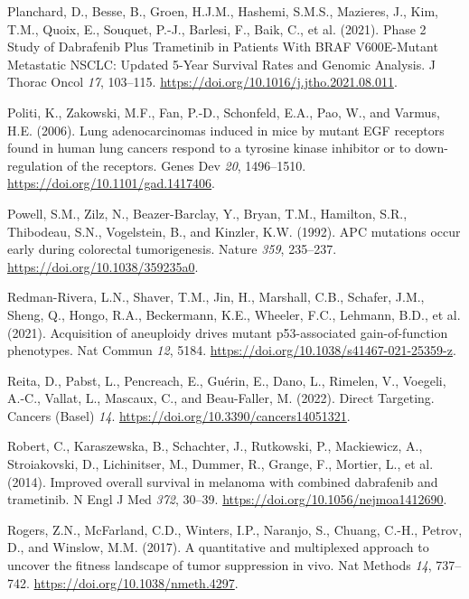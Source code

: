 \begin{CSLReferences}{0}{0}
\leavevmode{}%
Planchard, D., Besse, B., Groen, H.J.M., Hashemi, S.M.S., Mazieres, J., Kim, T.M., Quoix, E., Souquet, P.-J., Barlesi, F., Baik, C., et al. (2021). Phase 2 Study of Dabrafenib Plus Trametinib in Patients With BRAF V600E-Mutant Metastatic NSCLC: Updated 5-Year Survival Rates and Genomic Analysis. J Thorac Oncol \emph{17}, 103--115. \url{https://doi.org/10.1016/j.jtho.2021.08.011}.

\leavevmode{}%
Politi, K., Zakowski, M.F., Fan, P.-D., Schonfeld, E.A., Pao, W., and Varmus, H.E. (2006). Lung adenocarcinomas induced in mice by mutant EGF receptors found in human lung cancers respond to a tyrosine kinase inhibitor or to down-regulation of the receptors. Genes Dev \emph{20}, 1496--1510. \url{https://doi.org/10.1101/gad.1417406}.

\leavevmode{}%
Powell, S.M., Zilz, N., Beazer-Barclay, Y., Bryan, T.M., Hamilton, S.R., Thibodeau, S.N., Vogelstein, B., and Kinzler, K.W. (1992). APC mutations occur early during colorectal tumorigenesis. Nature \emph{359}, 235--237. \url{https://doi.org/10.1038/359235a0}.

\leavevmode{}%
Redman-Rivera, L.N., Shaver, T.M., Jin, H., Marshall, C.B., Schafer, J.M., Sheng, Q., Hongo, R.A., Beckermann, K.E., Wheeler, F.C., Lehmann, B.D., et al. (2021). Acquisition of aneuploidy drives mutant p53-associated gain-of-function phenotypes. Nat Commun \emph{12}, 5184. \url{https://doi.org/10.1038/s41467-021-25359-z}.

\leavevmode{}%
Reita, D., Pabst, L., Pencreach, E., Guérin, E., Dano, L., Rimelen, V., Voegeli, A.-C., Vallat, L., Mascaux, C., and Beau-Faller, M. (2022). Direct Targeting. Cancers (Basel) \emph{14}. \url{https://doi.org/10.3390/cancers14051321}.

\leavevmode{}%
Robert, C., Karaszewska, B., Schachter, J., Rutkowski, P., Mackiewicz, A., Stroiakovski, D., Lichinitser, M., Dummer, R., Grange, F., Mortier, L., et al. (2014). Improved overall survival in melanoma with combined dabrafenib and trametinib. N Engl J Med \emph{372}, 30--39. \url{https://doi.org/10.1056/nejmoa1412690}.

\leavevmode{}%
Rogers, Z.N., McFarland, C.D., Winters, I.P., Naranjo, S., Chuang, C.-H., Petrov, D., and Winslow, M.M. (2017). A quantitative and multiplexed approach to uncover the fitness landscape of tumor suppression in vivo. Nat Methods \emph{14}, 737--742. \url{https://doi.org/10.1038/nmeth.4297}.


\end{CSLReferences}
